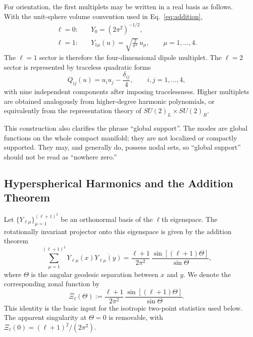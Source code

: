 \documentclass[
  aps,
  prd,
  reprint,
  superscriptaddress,
  nofootinbib,
  longbibliography,
  floatfix,
  amsmath,
  amssymb
]{revtex4-2}
\theoremstyle{plain}
\theoremstyle{definition}
\theoremstyle{remark}
\begin{document}
For orientation, the first multiplets may be written in a real basis as
follows. With the unit-sphere volume convention used in Eq.~\eqref{eq:addition},
\begin{align}
  \ell=0: \quad &Y_0 = (2\pi^2)^{-1/2}, \\
  \ell=1: \quad &Y_{1\mu}(u)=\sqrt{\frac{2}{\pi^2}}\,u_\mu,
    \qquad \mu=1,\ldots,4 .
\end{align}
The $\ell=1$ sector is therefore the four-dimensional dipole multiplet.
The $\ell=2$ sector is represented by traceless quadratic forms
\begin{equation}
  Q_{ij}(u)=u_i u_j-\frac{\delta_{ij}}{4},
  \qquad i,j=1,\ldots,4,
\end{equation}
with nine independent components after imposing tracelessness. Higher
multiplets are obtained analogously from higher-degree harmonic polynomials,
or equivalently from the representation theory of
$SU(2)_L\times SU(2)_R$.

This construction also clarifies the phrase ``global support''. The modes
are global functions on the whole compact manifold; they are not localized
or compactly supported. They may, and generally do, possess nodal sets, so
``global support'' should not be read as ``nowhere zero.''


\subsection{Hyperspherical Harmonics and the Addition Theorem}

Let $\{Y_{\ell\mu}\}_{\mu=1}^{(\ell+1)^2}$ be an orthonormal basis of the
$\ell$th eigenspace. The rotationally invariant projector onto this
eigenspace is given by the addition theorem
\begin{equation}
  \sum_{\mu=1}^{(\ell+1)^2}Y_{\ell\mu}(x)\overline{Y_{\ell\mu}(y)}
  =\frac{\ell+1}{2\pi^2}\,
  \frac{\sin[(\ell+1)\Theta]}{\sin\Theta},
  \label{eq:addition}
\end{equation}
where $\Theta$ is the angular geodesic separation between $x$ and $y$.
We denote the corresponding zonal function by
\begin{equation}
  \Xi_\ell(\Theta):=\frac{\ell+1}{2\pi^2}\,
  \frac{\sin[(\ell+1)\Theta]}{\sin\Theta}.
  \label{eq:zonal}
\end{equation}
This identity is the basic input for the isotropic two-point statistics
used below. The apparent singularity at $\Theta=0$ is removable, with
$\Xi_\ell(0)=(\ell+1)^2/(2\pi^2)$.
\end{document}
